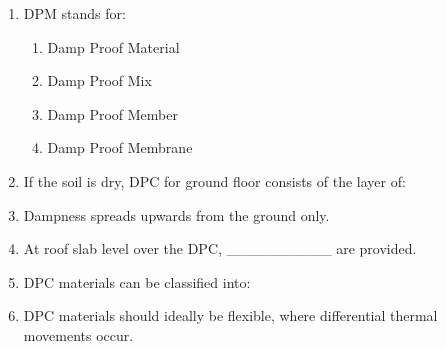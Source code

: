 \documentclass[11pt,a4paper]{article}
\begin{document}
\begin{enumerate}
\item{DPM stands for:}
\begin{enumerate}[label=\Alph*.]
\item{Damp Proof Material}
\item{Damp Proof Mix}
\item{Damp Proof Member }
\item{Damp Proof Membrane}
\end{enumerate}
\item{If the soil is dry, DPC for ground floor consists of the layer of:}
\\
\item{Dampness spreads upwards from the ground only.}
\\
\item{At roof slab level over the DPC, \_\_\_\_\_\_\_\_\_\_ are provided.}
\\
\item{DPC materials can be classified into:}
\\
\item{DPC materials should ideally be flexible, where differential thermal movements occur.}

\end{enumerate}
\end{document}
